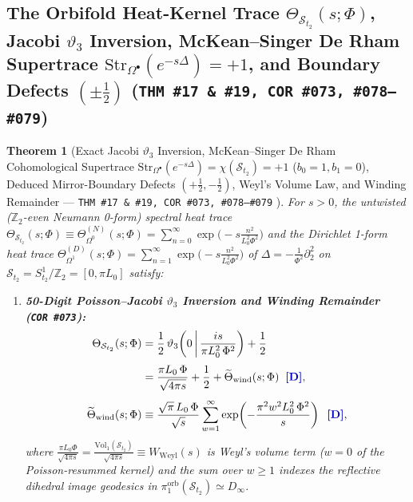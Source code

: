 \documentclass[11pt,a4paper]{article}
\newcommand{\catD}{\text{\textbf{\textcolor{blue!75!black}{[D]}}}}
\theoremstyle{definition}
\theoremstyle{plain}
\newtheorem{theorem}[axiom]{Theorem}
\theoremstyle{remark}
\begin{document}
\subsection{\texorpdfstring{The Orbifold Heat-Kernel Trace $\Theta_{\mathcal{S}_{t_2}}(s; \Phi)$, Jacobi $\vartheta_3$ Inversion, McKean--Singer De Rham Supertrace $\mathrm{Str}_{\Omega^\bullet}(e^{-s\Delta}) = +1$, and Boundary Defects $(\pm\frac{1}{2})$ (\texttt{THM~\#17 \& \#19, COR~\#073, \#078--\#079})}{The Orbifold Heat-Kernel Trace, Jacobi Theta Inversion, McKean-Singer De Rham Supertrace, and Boundary Defects}}

\begin{theorem}[Exact Jacobi $\vartheta_3$ Inversion, McKean--Singer De Rham Cohomological Supertrace $\mathrm{Str}_{\Omega^\bullet}(e^{-s\Delta}) = \chi(\mathcal{S}_{t_2}) = +1$ ($b_0=1, b_1=0$), Deduced Mirror-Boundary Defects $(+\frac{1}{2}, -\frac{1}{2})$, Weyl's Volume Law, and Winding Remainder --- \texttt{THM~\#17 \& \#19, COR~\#073, \#078--\#079} \catD]\label{thm:c4_jacobi_poisson_weyl}\label{thm:c4_orbifold_heat_trace}
For $s > 0$, the untwisted ($\mathbb{Z}_2$-even Neumann 0-form) spectral heat trace $\Theta_{\mathcal{S}_{t_2}}(s; \Phi) \equiv \Theta_{\Omega^0}^{(N)}(s; \Phi) = \sum_{n=0}^{\infty} \exp\!\big(-s\frac{n^2}{L_0^2\Phi^2}\big)$ and the Dirichlet 1-form heat trace $\Theta_{\Omega^1}^{(D)}(s; \Phi) = \sum_{n=1}^{\infty} \exp\!\big(-s\frac{n^2}{L_0^2\Phi^2}\big)$ of $\Delta = -\frac{1}{\Phi^2}\partial_2^2$ on $\mathcal{S}_{t_2} = S^1_{t_2}/\mathbb{Z}_2 = [0, \pi L_0]$ satisfy:
\begin{enumerate}[label=(\roman*)]
  \item \textbf{50-Digit Poisson--Jacobi $\vartheta_3$ Inversion and Winding Remainder (\texttt{COR~\#073}):}
  \begin{align}
  \Theta_{\mathcal{S}_{t_2}}(s; \Phi) &= \frac{1}{2}\,\vartheta_3\!\left(0\,\middle|\,\frac{is}{\pi L_0^2\,\Phi^2}\right) + \frac{1}{2} \nonumber \\[3pt]
  &= \frac{\pi L_0\,\Phi}{\sqrt{4\pi s}} + \frac{1}{2} + \widetilde{\Theta}_{\mathrm{wind}}(s; \Phi) \;\;\catD, \label{eq:c4_poisson_winding_sum} \\[4pt]
  \widetilde{\Theta}_{\mathrm{wind}}(s; \Phi) &\equiv \frac{\sqrt{\pi}\,L_0\,\Phi}{\sqrt{s}}\sum_{w=1}^{\infty} \exp\!\left(-\frac{\pi^2 w^2 L_0^2\,\Phi^2}{s}\right) \;\;\catD, \label{eq:c4_winding_remainder_def}
  \end{align}
  where $\frac{\pi L_0\Phi}{\sqrt{4\pi s}} = \frac{\mathrm{Vol}_1(\mathcal{S}_{t_2})}{\sqrt{4\pi s}} \equiv W_{\mathrm{Weyl}}(s)$ is Weyl's volume term ($w = 0$ of the Poisson-resummed kernel) and the sum over $w \ge 1$ indexes the reflective dihedral image geodesics in $\pi_1^{\mathrm{orb}}(\mathcal{S}_{t_2}) \simeq D_\infty$.

\end{enumerate}
\end{theorem}
\end{document}
